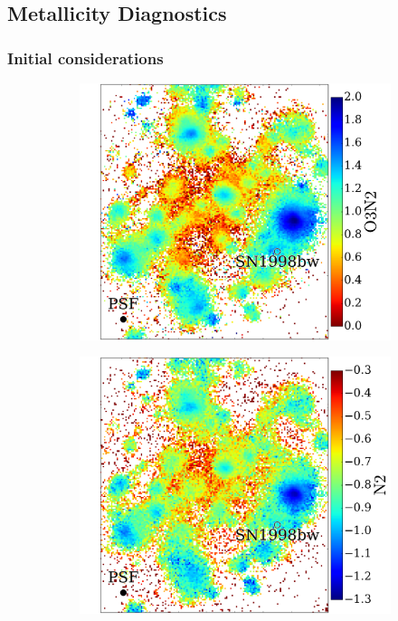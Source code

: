 \documentclass[traditabstract]{aa}
\begin{document}
\subsection{Metallicity Diagnostics}

\subsubsection{Initial considerations}

\begin{figure}
\begin{subfigure}{.24\textwidth}
  \includegraphics[width=0.999\linewidth]{Figs/MUSE_SN1998bw_O3N2.pdf}
\end{subfigure}
\begin{subfigure}{.24\textwidth}
  \includegraphics[width=0.999\linewidth]{Figs/MUSE_SN1998bw_N2.pdf}

\end{subfigure}
\end{figure}
\end{document}
